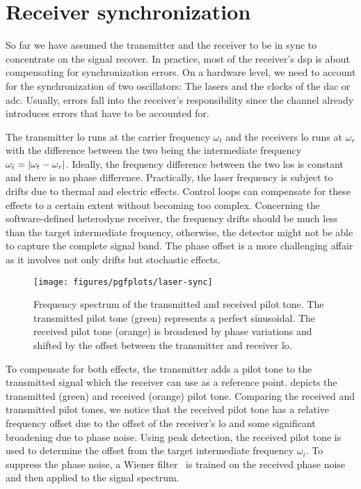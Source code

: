 \chapter{Receiver synchronization}\label{app:synchronization}

\cite[p.~359]{Proakis2007} %
\cite{Godard1978} %
\cite{Huang2015,Qi2015,Soh2015} %

So far we have assumed the transmitter and the receiver to be in sync to concentrate on the signal recover.
In practice, most of the receiver's \gls{dsp} is about compensating for synchronization errors.
On a hardware level, we need to account for the synchronization of two oscillators:
The lasers and the clocks of the \gls{dac} or \gls{adc}.
Usually, errors fall into the receiver's responsibility since the channel already introduces errors that have to be accounted for.

The transmitter \gls{lo} runs at the carrier frequency $\omega_t$ and the receivers \gls{lo} runs at $\omega_r$ with the difference between the two being the intermediate frequency $\omega_i=\lvert\omega_t-\omega_r\rvert$.
Ideally, the frequency difference between the two \glspl{lo} is constant and there is no phase difference.
Practically, the laser frequency is subject to drifts due to thermal and electric effects.
Control loops can compensate for these effects to a certain extent without becoming too complex.
Concerning the software-defined heterodyne receiver, the frequency drifts should be much less than the target intermediate frequency, otherwise, the detector might not be able to capture the complete signal band.
The phase offset is a more challenging affair as it involves not only drifts but stochastic effects.
\begin{figure}[htb]
	\centering
	\texttt{[image: figures/pgfplots/laser-sync]}
	\caption{Frequency spectrum of the transmitted and received pilot tone. The transmitted pilot tone (green) represents a perfect sinusoidal. The received pilot tone (orange) is broadened by phase variations and shifted by the offset between the transmitter and receiver \gls{lo}.}\label{fig:pilot_tones}
\end{figure}
To compensate for both effects, the transmitter adds a pilot tone to the transmitted signal which the receiver can use as a reference point.
 depicts the transmitted (green) and received (orange) pilot tone.
Comparing the received and transmitted pilot tones, we notice that the received pilot tone has a relative frequency offset due to the offset of the receiver's \gls{lo} and some significant broadening due to phase noise.
Using peak detection, the received pilot tone is used to determine the offset from the target intermediate frequency $\omega_i$.
To suppress the phase noise, a Wiener filter~\cite{Chen2006} is trained on the received phase noise and then applied to the signal spectrum.

